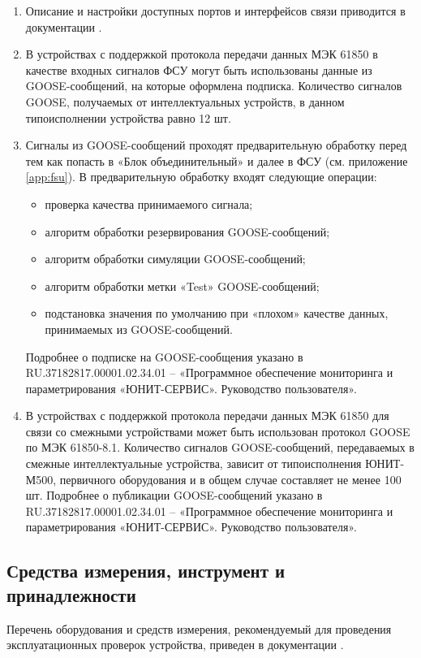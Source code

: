 \begin{enumerate}

\item
\sloppy Описание и настройки доступных портов и интерфейсов связи приводится в документации \ManualUnitGeneral.

\item
В устройствах с поддержкой протокола передачи данных МЭК 61850 в качестве входных сигналов ФСУ могут быть использованы данные из GOOSE-сообщений, на которые оформлена подписка.
Количество сигналов GOOSE, получаемых от интеллектуальных устройств, в данном типоисполнении устройства равно 12 шт.

\item
Сигналы из GOOSE-сообщений проходят предварительную обработку перед тем как попасть в «Блок объединительный» и далее в ФСУ (см. приложение \ref{app:fsu}).
В предварительную обработку входят следующие операции:
\begin{itemize}
\item проверка качества принимаемого сигнала;
\item алгоритм обработки резервирования GOOSE-сообщений;
\item алгоритм обработки симуляции GOOSE-сообщений;
\item алгоритм обработки метки «Test» GOOSE-сообщений;
\item подстановка значения по умолчанию при «плохом» качестве данных, принимаемых из GOOSE-сообщений.
\end{itemize}
Подробнее о подписке на GOOSE-сообщения указано в RU.37182817.00001.02.34.01 – «Программное обеспечение мониторинга и параметрирования «ЮНИТ-СЕРВИС». Руководство пользователя».

\item 
В устройствах с поддержкой протокола передачи данных МЭК 61850 для связи со смежными устройствами может быть использован протокол GOOSE по МЭК 61850-8.1.
Количество сигналов GOOSE-сообщений, передаваемых в смежные интеллектуальные устройства, зависит от типоисполнения ЮНИТ-М500, первичного оборудования и в общем случае составляет не менее 100 шт.
Подробнее о публикации GOOSE-сообщений указано в RU.37182817.00001.02.34.01 – «Программное обеспечение мониторинга и параметрирования «ЮНИТ-СЕРВИС». Руководство пользователя».

\end{enumerate}

\color{unidarkgreen}\subsection{Средства измерения, инструмент и принадлежности}\color{black}
Перечень оборудования и средств измерения, рекомендуемый для проведения эксплуатационных проверок устройства, приведен в документации \ManualUnitGeneral.

